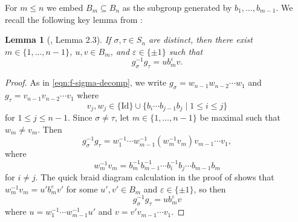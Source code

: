 \documentclass[11pt, reqno]{amsart}
\newtheorem{lem}[thm]{Lemma}
\theoremstyle{definition}\newtheorem{defi}[thm]{Definition}
\theoremstyle{definition}\newtheorem{rem}[thm]{Remark}
\theoremstyle{definition}\newtheorem{exam}[thm]{Example}
\theoremstyle{definition}\newtheorem{assum}[thm]{Assumption}
\newcommand{\Id}{\mathrm{Id}}
\begin{document}
For $m\leq n$ we embed $B_m\subseteq B_n$ as the subgroup generated by $b_1,\ldots, b_{m-1}$. We recall the following key lemma from \cite{EP}:
\begin{lem}[\cite{EP}, Lemma 2.3]\label{lem:EP}
If $\sigma,\tau\in S_n$ are distinct, then there exist $m\in\lbrace 1,\ldots, n-1\rbrace$, $u,v\in B_m$, and $\varepsilon\in\lbrace \pm 1\rbrace$ such that
\begin{equation*}
g_\sigma^{-1} g_\tau = u b_m^\varepsilon v.
\end{equation*}
\end{lem}

\begin{proof}
As in \eqref{eqn:f-sigma-decomp}, we write $g_\sigma= w_{n-1} w_{n-2}\cdots w_1$ and $g_\tau=v_{n-1} v_{n-2}\cdots v_1$ where
\begin{equation*}
v_j,w_j\in\lbrace\Id\rbrace\cup\lbrace b_i\cdots b_{j-1}b_j\mid 1\leq i\leq j\rbrace
\end{equation*}
for $1\leq j\leq n-1$. Since $\sigma\neq\tau$, let $m\in\lbrace 1,\ldots, n-1\rbrace$ be maximal such that $w_m\neq v_m$. Then
\begin{equation*}
g_\sigma^{-1} g_\tau = w_1^{-1}\cdots w_{m-1}^{-1}(w_m^{-1}v_m)v_{m-1}\cdots v_1,
\end{equation*}
where
\begin{equation*}
w_m^{-1} v_m = b_m^{-1}b_{m-1}^{-1}\cdots b_i^{-1}b_j\cdots b_{m-1}b_m
\end{equation*}
for $i\neq j$. The quick braid diagram calculation in the proof of \cite[Lemma 2.3]{EP} shows that $w_m^{-1} v_m =u' b_m^\varepsilon v'$ for some $u',v'\in B_m$ and $\varepsilon\in\lbrace\pm 1\rbrace$, so then 
\begin{equation*}
g_\sigma^{-1}g_\tau =u b_m^\varepsilon v
\end{equation*}
where $u= w_1^{-1}\cdots w_{m-1}^{-1} u'$ and $v= v'v_{m-1}\cdots v_1$.
\end{proof}
\end{document}
